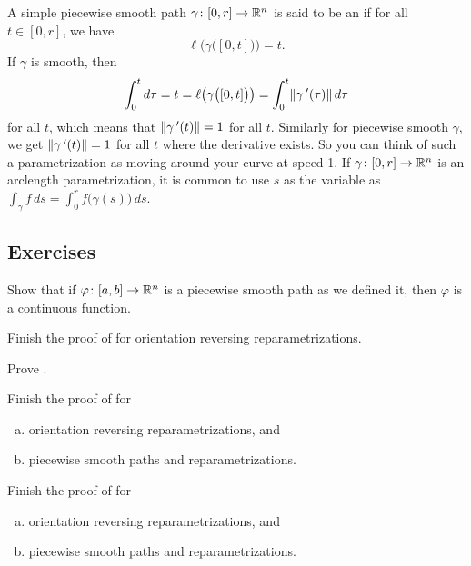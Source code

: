 A simple piecewise smooth path $\gamma \colon [0,r] \to {\mathbb{R}}^n$ is
said to be an \emph{} if
for all $t \in [0,r]$, we have
\begin{equation*}
\ell\bigl( \gamma\bigl([0,t]\bigr) \bigr) = t .
\end{equation*}
If $\gamma$ is smooth, then
\begin{equation*}
\int_0^t d\tau =
t = \ell\bigl( \gamma\bigl([0,t]\bigr) \bigr) =
\int_0^t
\lVert {\gamma^{\:\prime}(\tau)} \rVert
\, d\tau
\end{equation*}
for all $t$,
which means that $\lVert {\gamma^{\:\prime}(t)} \rVert = 1$ for all $t$.
Similarly for piecewise smooth $\gamma$, we get
$\lVert {\gamma^{\:\prime}(t)} \rVert = 1$ for all $t$ where the derivative exists.
So you can think of such a parametrization as moving around your curve at speed
1.  If $\gamma \colon [0,r] \to {\mathbb{R}}^n$ is an arclength parametrization, it is
common to use $s$ as the variable as $\int_\gamma f \,ds
= \int_0^r f\bigl(\gamma(s)\bigr) \,ds$.

\subsection{Exercises}

\begin{exercise}
Show that if $\varphi \colon [a,b] \to {\mathbb{R}}^n$ is a piecewise smooth path as we
defined it, then $\varphi$ is a continuous function.
\end{exercise}

\begin{exercise}
Finish the proof of  for orientation
reversing reparametrizations.
\end{exercise}

\begin{exercise}
Prove .
\end{exercise}

\begin{exercise} \label{mv:exercise:pathpiece}
Finish the proof of 
for
\begin{enumerate}[a)]
\item
orientation reversing reparametrizations, and
\item
piecewise smooth paths
and reparametrizations.
\end{enumerate}
\end{exercise}

\begin{exercise} \label{mv:exercise:linepiece}
Finish the proof of 
for
\begin{enumerate}[a)]
\item
orientation reversing reparametrizations, and
\item
piecewise smooth paths
and reparametrizations.
\end{enumerate}
\end{exercise}

